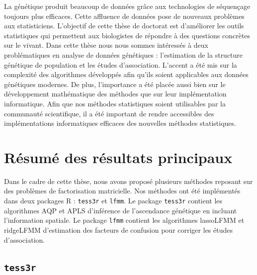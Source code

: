 \documentclass[12pt,a4paper,twoside]{ugathesis}
\begin{document}
La génétique produit beaucoup de données grâce aux technologies de séquençage
toujours plus efficaces. Cette affluence de données pose de nouveaux problèmes
aux statisticiens. L'objectif de cette thèse de doctorat est d'améliorer les
outils statistiques qui permettent aux biologistes de répondre à des questions
concrètes sur le vivant. Dans cette thèse nous nous sommes intéressés à deux
problématiques en analyse de données génétiques : l'estimation de la structure
génétique de population et les études d'association. L'accent a été mis sur la
complexité des algorithmes développés afin qu'ils soient applicables aux données
génétiques modernes. De plus, l'importance a été placée aussi bien sur le
développement mathématique des méthodes que sur leur implémentation
informatique. Afin que nos méthodes statistiques soient utilisables par la
communauté scientifique, il a été important de rendre accessibles des
implémentations informatiques efficaces des nouvelles méthodes statistiques.

\section{Résumé des résultats principaux}
\label{sec:orga44a34d}

Dans le cadre de cette thèse, nous avons proposé plusieurs méthodes reposant sur
des problèmes de factorisation matricielle. Nos méthodes ont été implémentés
dans deux packages R : \texttt{tess3r} et \texttt{lfmm}. Le package \texttt{tess3r} contient les
algorithmes AQP et APLS d'inférence de l'ascendance génétique en incluant
l'information spatiale. Le package \texttt{lfmm} contient les algorithmes lassoLFMM et
ridgeLFMM d'estimation des facteurs de confusion pour corriger les études
d'association.


\subsection{\texttt{tess3r}}
\label{sec:org2ca1207}
\end{document}

